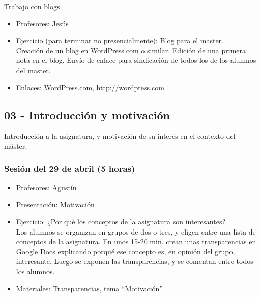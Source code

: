\documentclass[a4paper,12pt]{article}
\begin{document}
Trabajo con blogs.

\begin{itemize}
\item Profesores: Jesús
\item Ejercicio (para terminar no presencialmente): Blog para el master. \\
Creación de un blog en WordPress.com o similar. Edición de una primera nota en el blog. Envío de enlace para sindicación de todos los de los alumnos del master.
\item Enlaces: WordPress.com, \url{http://wordpress.com}
\end{itemize}

\subsection{03 - Introducción y motivación}

Introducción a la asignatura, y motivación de su interés en el contexto del máster.

\subsubsection{Sesión del 29 de abril (5 horas)}

\begin{itemize}
\item Profesores: Agustín
\item Presentación: Motivación
\item Ejercicio: ¿Por qué los conceptos de la asignatura son interesantes? \\
  Los alumnos se organizan en grupos de dos o tres, y eligen entre una lista de conceptos de la asignatura. En unos 15-20 min. crean unas transparencias en Google Docs explicando porqué ese concepto es, en opinión del grupo, interesante. Luego se exponen las transparencias, y se comentan entre todos los alumnos.
\item Materiales: Transparencias, tema ``Motivación''
\end{itemize}

\end{document}
